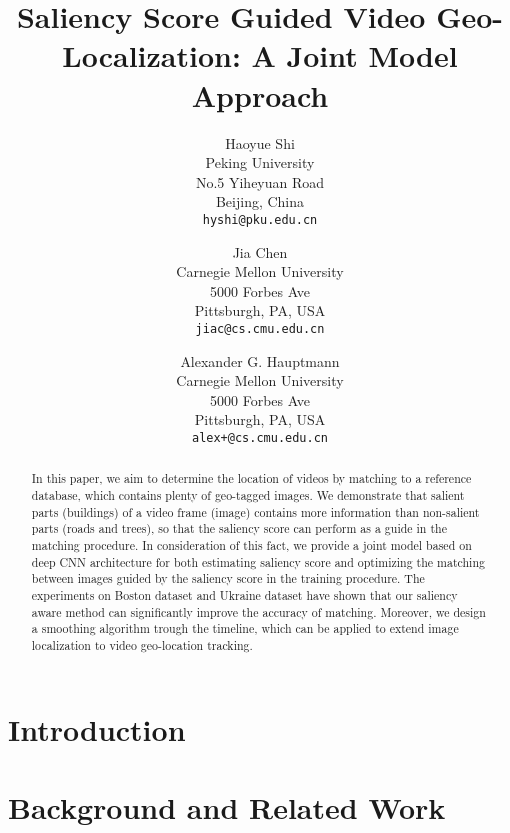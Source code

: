 \documentclass[10pt,twocolumn,letterpaper]{article}
\begin{document}
\title{Saliency Score Guided Video Geo-Localization: A Joint Model Approach}

\author{Haoyue Shi\\
Peking University\\
No.5 Yiheyuan Road\\
Beijing, China\\
{\tt\small hyshi@pku.edu.cn}
\and
Jia Chen\\
Carnegie Mellon University\\
5000 Forbes Ave\\
Pittsburgh, PA, USA\\
{\tt\small jiac@cs.cmu.edu.cn}
\and
Alexander G. Hauptmann\\
Carnegie Mellon University\\
5000 Forbes Ave\\
Pittsburgh, PA, USA\\
{\tt\small alex+@cs.cmu.edu.cn}
}

\maketitle

\begin{abstract}
In this paper, we aim to determine the location of videos by matching to a reference database, which contains plenty of geo-tagged images. We demonstrate that salient parts (\eg buildings) of a video frame (\ie image) contains more information than non-salient parts (\eg roads and trees), so that the saliency score can perform as a guide in the matching procedure. In consideration of this fact, we provide a joint model based on deep CNN architecture for both estimating saliency score and optimizing the matching between images guided by the saliency score in the training procedure. The experiments on Boston dataset and Ukraine dataset have shown that our saliency aware method can significantly improve the accuracy of matching. Moreover, we design a smoothing algorithm trough the timeline, which can be applied to extend image localization to video geo-location tracking.
\end{abstract}

\section{Introduction}

\section{Background and Related Work}
\end{document}
